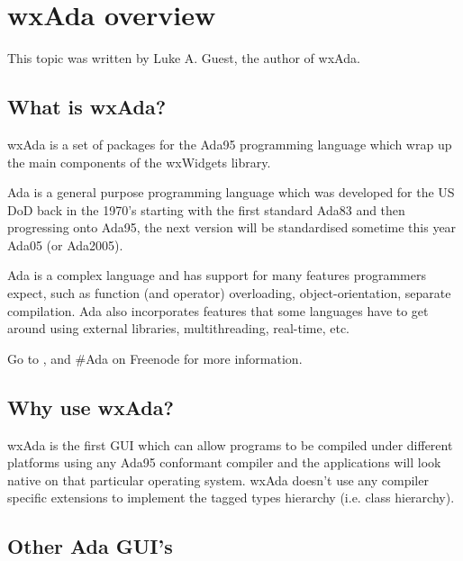 \section{wxAda overview}\label{wxadaoverview}

This topic was written by Luke A. Guest, the author of wxAda.


\subsection{What is wxAda?}\label{whatiswxada}

wxAda is a set of packages for the Ada95 programming language which wrap up the main components of the wxWidgets library.


Ada is a general purpose programming language which was developed for the US DoD back in the 1970's starting with the first standard
Ada83 and then progressing onto Ada95, the next version will be standardised sometime this year Ada05 (or Ada2005).

Ada is a complex language and has support for many features programmers expect, such as function (and operator) overloading,
object-orientation, separate compilation. Ada also incorporates features that some languages have to get around using external libraries,
multithreading, real-time, etc.

Go to ,  and #Ada on Freenode for more information.

\subsection{Why use wxAda?}\label{whyusewxada}

wxAda is the first GUI which can allow programs to be compiled under different platforms using any Ada95 conformant compiler and the
applications will look native on that particular operating system. wxAda doesn't use any compiler specific extensions to implement
the tagged types hierarchy (i.e. class hierarchy).

\subsection{Other Ada GUI's}\label{otheradaguis}

